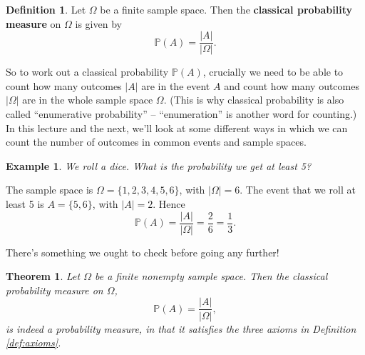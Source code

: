 \documentclass[
  a4paper,
]{book}
\newtheorem{theorem}{Theorem}[chapter]
\theoremstyle{definition}
\newtheorem{definition}{Definition}[chapter]
\theoremstyle{definition}
\newtheorem{example}{Example}[chapter]
\theoremstyle{definition}
\theoremstyle{definition}
\theoremstyle{remark}
\begin{document}
\begin{definition}
Let \(\Omega\) be a finite sample space. Then the \textbf{classical probability measure} on \(\Omega\) is given by
\[ \mathbb P(A) = \frac{|A|}{|\Omega|} . \]
\end{definition}

So to work out a classical probability \(\mathbb P(A)\), crucially we need to be able to count how many outcomes \(|A|\) are in the event \(A\) and count how many outcomes \(|\Omega|\) are in the whole sample space \(\Omega\). (This is why classical probability is also called ``enumerative probability'' -- ``enumeration'' is another word for counting.) In this lecture and the next, we'll look at some different ways in which we can count the number of outcomes in common events and sample spaces.

\begin{example}
\emph{We roll a dice. What is the probability we get at least 5?}

The sample space is \(\Omega = \{1,2,3,4,5,6\}\), with \(|\Omega| = 6\). The event that we roll at least 5 is \(A = \{5,6\}\), with \(|A| = 2\). Hence
\[ \mathbb P(A) = \frac{|A|}{|\Omega|} = \frac{2}{6} = \frac{1}{3} . \]
\end{example}

There's something we ought to check before going any further!

\begin{theorem}
Let \(\Omega\) be a finite nonempty sample space. Then the classical probability measure on \(\Omega\),
\[ \mathbb P(A) = \frac{|A|}{|\Omega|} , \]
is indeed a probability measure, in that it satisfies the three axioms in Definition \ref{def:axioms}.
\end{theorem}
\end{document}

